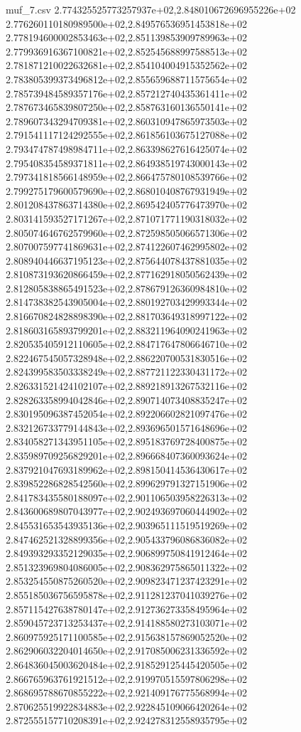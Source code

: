 \begin{filecontents*}{muf_7.csv}
2.774325525773257937e+02,2.848010672696955226e+02
2.776260110180989500e+02,2.849576536951453818e+02
2.778194600002853463e+02,2.851139853909789963e+02
2.779936916367100821e+02,2.852545688997588513e+02
2.781871210022632681e+02,2.854104004915352562e+02
2.783805399373496812e+02,2.855659688711575654e+02
2.785739484589357176e+02,2.857212740435361411e+02
2.787673465839807250e+02,2.858763160136550141e+02
2.789607343294709381e+02,2.860310947865973503e+02
2.791541117124292555e+02,2.861856103675127088e+02
2.793474787498984711e+02,2.863398627616425074e+02
2.795408354589371811e+02,2.864938519743000143e+02
2.797341818566148959e+02,2.866475780108539766e+02
2.799275179600579690e+02,2.868010408767931949e+02
2.801208437863714380e+02,2.869542405776473970e+02
2.803141593527171267e+02,2.871071771190318032e+02
2.805074646762579960e+02,2.872598505066571306e+02
2.807007597741869631e+02,2.874122607462995802e+02
2.808940446637195123e+02,2.875644078437881035e+02
2.810873193620866459e+02,2.877162918050562439e+02
2.812805838865491523e+02,2.878679126360984810e+02
2.814738382543905004e+02,2.880192703429993344e+02
2.816670824828898390e+02,2.881703649318997122e+02
2.818603165893799201e+02,2.883211964090241963e+02
2.820535405912110605e+02,2.884717647806646710e+02
2.822467545057328948e+02,2.886220700531830516e+02
2.824399583503338249e+02,2.887721122330431172e+02
2.826331521424102107e+02,2.889218913267532116e+02
2.828263358994042846e+02,2.890714073408835247e+02
2.830195096387452054e+02,2.892206602821097476e+02
2.832126733779144843e+02,2.893696501571648696e+02
2.834058271343951105e+02,2.895183769728400875e+02
2.835989709256829201e+02,2.896668407360093624e+02
2.837921047693189962e+02,2.898150414536430617e+02
2.839852286828542560e+02,2.899629791327151906e+02
2.841783435580188097e+02,2.901106503958226313e+02
2.843600689807043977e+02,2.902493697060444902e+02
2.845531653543935136e+02,2.903965111519519269e+02
2.847462521328899356e+02,2.905433796086836082e+02
2.849393293352129035e+02,2.906899750841912464e+02
2.851323969804086005e+02,2.908362975865011322e+02
2.853254550875260520e+02,2.909823471237423291e+02
2.855185036756595878e+02,2.911281237041039276e+02
2.857115427638780147e+02,2.912736273358495964e+02
2.859045723713253437e+02,2.914188580273103071e+02
2.860975925171100585e+02,2.915638157869052520e+02
2.862906032204014650e+02,2.917085006231336592e+02
2.864836045003620484e+02,2.918529125445420505e+02
2.866765963761921512e+02,2.919970515597806298e+02
2.868695788670855222e+02,2.921409176775568994e+02
2.870625519922834883e+02,2.922845109066420264e+02
2.872555157710208391e+02,2.924278312558935795e+02

\end{filecontents*}
